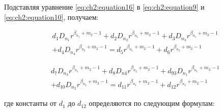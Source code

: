 Подставляя уравнение \cref{eq:ch2:equation16} в \cref{eq:ch2:equation9} и \cref{eq:ch2:equation10}, получаем:

\begin{equation}
\label{eq:ch2:equation17}
\begin{split}
	&d_1 D_{n_1} r^{\beta_{n_1}+m_2-1} + d_2 D_{n_2} r^{\beta_{n_2}+m_2-1} + d_3 D_{n_3} r^{\beta_{n_1}+m_2-1} \\
	&+d_4 D_{n_4} r^{\beta_{n_2}+m_2-1} = d_5  r^{\beta_{n_1}+m_2-1} + d_6  r^{\beta_{n_2}+m_2-1}
\end{split}
\end{equation}

\begin{equation}
\label{eq:ch2:equation18}
\begin{split}
	&d_7 D_{n_3} r^{\beta_{n_1}+m_2-1} + d_8 D_{n4} r^{\beta_{n_2}+m_2-1} + d_93 D_{n_1} r^{\beta_{n_1}+m_2-1} \\
	&+d_{10} D_{n_2} r^{\beta_{n_2}+m_2-1} = d_{11} r^{\beta_{n_1}+m_2-1} + d_{12}  r^{\beta_{n_2}+m_2-1}
\end{split}
\end{equation}

где константы от \(d_1\) до \(d_{12}\) определяются по следующим формулам:

